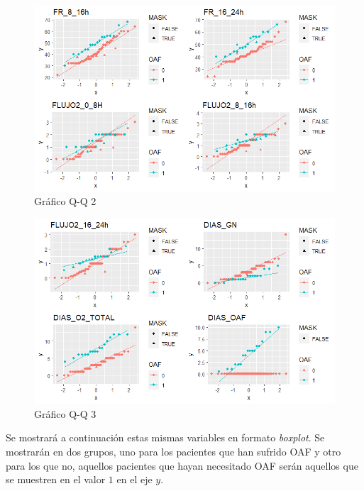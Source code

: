 \begin{figure}[H]
    \centering
    \includegraphics[scale = 1]{./img/qq2.png}
    \caption{Gráfico Q-Q 2}\label{fig:qq2}
\end{figure}

\begin{figure}[H]
    \centering
    \includegraphics[scale = 1]{./img/qq3.png}
    \caption{Gráfico Q-Q 3}\label{fig:qq3}
\end{figure}

Se mostrará a continuación estas mismas variables en formato \textit{boxplot}. Se mostrarán en dos grupos, uno para los pacientes que han sufrido OAF y otro para los que no, aquellos pacientes que hayan necesitado OAF serán aquellos que se muestren en el valor $1$ en el eje $y$.

